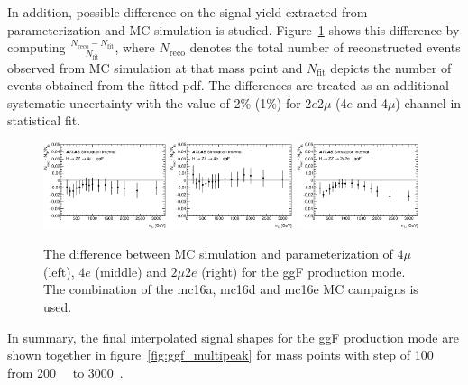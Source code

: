 In addition, possible difference on the signal yield extracted from parameterization and MC simulation is studied.
Figure~\ref{fig:ggf_graph_YieldCheckAll} shows this difference by computing $\frac{N_{\text{reco}}-N_{\text{fit}}}{N_{\text{fit}}}$, where $N_{\text{reco}}$ denotes the total number of reconstructed events observed from MC simulation at that mass point
and $N_{\text{fit}}$ depicts the number of events obtained from the fitted pdf.
The differences are treated as an additional systematic uncertainty with the value of 2\% (1\%) for 2$e$2$\mu$ (4$e$ and 4$\mu$) channel in statistical fit.

\begin{figure}[htbp]
    \centering
    \includegraphics[width=0.32\textwidth]{figures/HMHZZ/signal/NWA//ggf_graph_YieldCheck_4mu_fixed.eps}
    \includegraphics[width=0.32\textwidth]{figures/HMHZZ/signal/NWA//ggf_graph_YieldCheck_4e_fixed.eps}
    \includegraphics[width=0.32\textwidth]{figures/HMHZZ/signal/NWA//ggf_graph_YieldCheck_2mu2e_fixed.eps}
    \caption{The difference between MC simulation and parameterization of
    $4\mu$ (left), $4e$ (middle) and $2\mu 2e$ (right) for the ggF production
    mode. The combination of the mc16a, mc16d and mc16e MC campaigns is used.}
    \label{fig:ggf_graph_YieldCheckAll}
\end{figure}

In summary, the final interpolated signal shapes for the ggF production mode are shown together in figure~\ref{fig:ggf_multipeak} for mass points with step of 100~\gev~ from 200~\gev~ to 3000~\gev.


